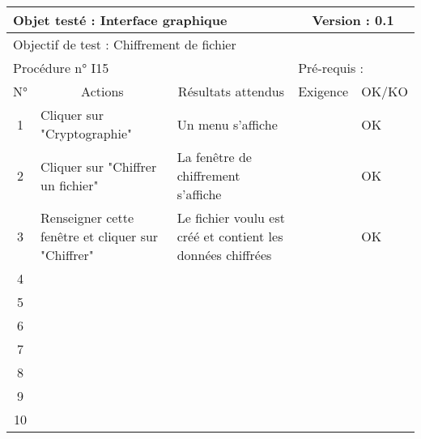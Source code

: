 \documentclass{../res/univ-projet}
\begin{document}
\begin{center}
    \begin{tabular}{|c|p{5cm}|p{5cm}|p{1.5cm}|p{1.5cm}|}
      \hline
      \multicolumn{3}{|l|}{Objet testé : Interface graphique} & \multicolumn{2}{c|}{Version : 0.1}\\ \hline
      \multicolumn{5}{|l|}{Objectif de test : Chiffrement de fichier}\\ \hline
      \multicolumn{3}{|l|}{Procédure n° I15} & \multicolumn{2}{p{3cm}|}{Pré-requis : }\\ \hline
      \multicolumn{1}{|c|}{N°} & \multicolumn{1}{c|}{Actions} & \multicolumn{1}{c|}{Résultats attendus} & 
      \multicolumn{1}{c|}{Exigence} & \multicolumn{1}{c|}{OK/KO}\\ \hline
      1 & Cliquer sur "Cryptographie" & Un menu s'affiche &  & OK \\
      2 & Cliquer sur "Chiffrer un fichier" & La fenêtre de chiffrement s'affiche &  & OK\\
      3 & Renseigner cette fenêtre et cliquer sur "Chiffrer" & Le fichier voulu est créé et contient les données chiffrées &  & OK\\ 
      4 &  &  &  & \\
      5 &  &  &  & \\
      6 &  &  &  & \\
      7 &  &  &  & \\
      8 &  &  &  & \\
      9 &  &  &  & \\
      10 &  &  &  &\\ 
  \hline
    \end{tabular}
    \vskip 2.2cm


\end{center}
\end{document}
